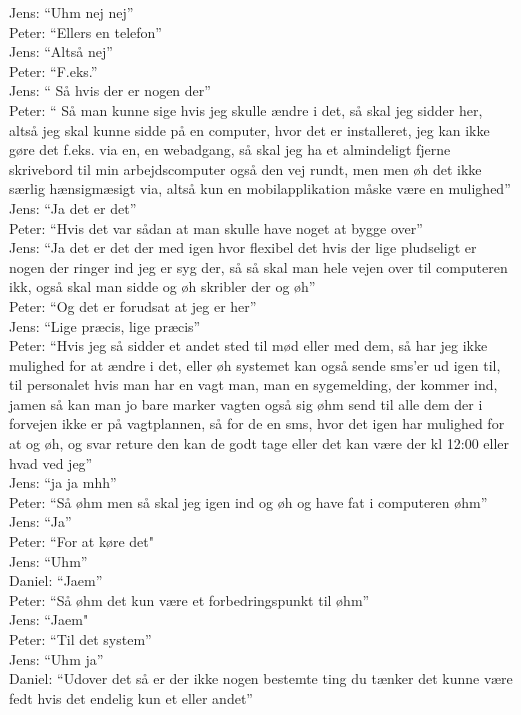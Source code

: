 Jens: “Uhm nej nej”\\
Peter: “Ellers en telefon”\\
Jens: “Altså nej”\\
Peter: “F.eks.”\\
Jens: “ Så hvis der er nogen der”\\
Peter: “ Så man kunne sige hvis jeg skulle ændre i det, så skal jeg sidder her, altså jeg skal kunne sidde på en computer, hvor det er installeret, jeg kan ikke gøre det f.eks. via en, en webadgang, så skal jeg ha et almindeligt fjerne skrivebord til min arbejdscomputer også den vej rundt, men men øh det ikke særlig hænsigmæsigt via, altså kun en mobilapplikation måske være en mulighed”\\
Jens: “Ja det er det”\\
Peter: “Hvis det var sådan at man skulle have noget at bygge over”\\
Jens: “Ja det er det der med igen hvor flexibel det hvis der lige pludseligt er nogen der ringer ind jeg er syg der, så så skal man hele vejen over til computeren ikk, også skal man sidde og øh skribler der og øh”\\
Peter: “Og det er forudsat at jeg er her”\\
Jens: “Lige præcis, lige præcis”\\
Peter: “Hvis jeg så sidder et andet sted til mød eller med dem, så har jeg ikke mulighed for at ændre i det, eller øh systemet kan også sende sms’er ud igen til, til personalet hvis man har en vagt man, man en sygemelding, der kommer ind, jamen så kan man jo bare marker vagten også sig øhm send til alle dem der i forvejen ikke er på vagtplannen, så for de en sms, hvor det igen har mulighed for at og øh, og svar reture den kan de godt tage eller det kan være der kl 12:00 eller hvad ved jeg”\\
Jens: “ja ja mhh”\\
Peter: “Så øhm men så skal jeg igen ind og øh og have fat i computeren øhm”\\
Jens: “Ja”\\
Peter: “For at køre det"\\
Jens: “Uhm”\\
Daniel: “Jaem”\\
Peter: “Så øhm det kun være et forbedringspunkt til øhm”\\
Jens: “Jaem"\\
Peter: “Til det system”\\
Jens: “Uhm ja”\\
Daniel: “Udover det så er der ikke nogen bestemte ting du tænker det kunne være fedt hvis det endelig kun et eller andet”\\
